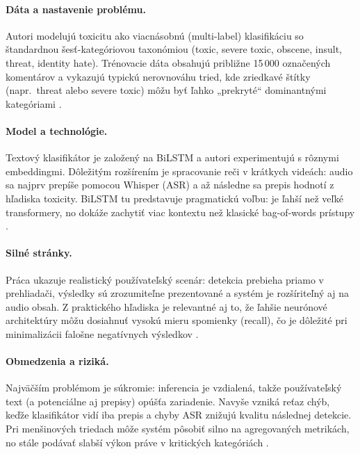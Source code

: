 \paragraph{Dáta a nastavenie problému.}
Autori modelujú toxicitu ako viacnásobnú (multi-label) klasifikáciu so štandardnou šesť-kategóriovou taxonómiou (toxic, severe toxic, obscene, insult, threat, identity hate). Trénovacie dáta obsahujú približne 15\,000 označených komentárov a vykazujú typickú nerovnováhu tried, kde zriedkavé štítky (napr.\ threat alebo severe toxic) môžu byť ľahko „prekryté“ dominantnými kategóriami \cite{sikiandani2025browser}.

\paragraph{Model a technológie.}
Textový klasifikátor je založený na BiLSTM a autori experimentujú s rôznymi embeddingmi. Dôležitým rozšírením je spracovanie reči v krátkych videách: audio sa najprv prepíše pomocou Whisper (ASR) a až následne sa prepis hodnotí z hľadiska toxicity. BiLSTM tu predstavuje pragmatickú voľbu: je ľahší než veľké transformery, no dokáže zachytiť viac kontextu než klasické bag-of-words prístupy \cite{sikiandani2025browser}\cite{radford2022whisper}.

\paragraph{Silné stránky.}
Práca ukazuje realistický používateľský scenár: detekcia prebieha priamo v prehliadači, výsledky sú zrozumiteľne prezentované a systém je rozšíriteľný aj na audio obsah. Z praktického hľadiska je relevantné aj to, že ľahšie neurónové architektúry môžu dosiahnuť vysokú mieru spomienky (recall), čo je dôležité pri minimalizácii falošne negatívnych výsledkov \cite{sikiandani2025browser}.

\paragraph{Obmedzenia a riziká.}
Najväčším problémom je súkromie: inferencia je vzdialená, takže používateľský text (a potenciálne aj prepisy) opúšťa zariadenie. Navyše vzniká reťaz chýb, keďže klasifikátor vidí iba prepis a chyby ASR znižujú kvalitu následnej detekcie. Pri menšinových triedach môže systém pôsobiť silno na agregovaných metrikách, no stále podávať slabší výkon práve v kritických kategóriách \cite{sikiandani2025browser}\cite{radford2022whisper}.

